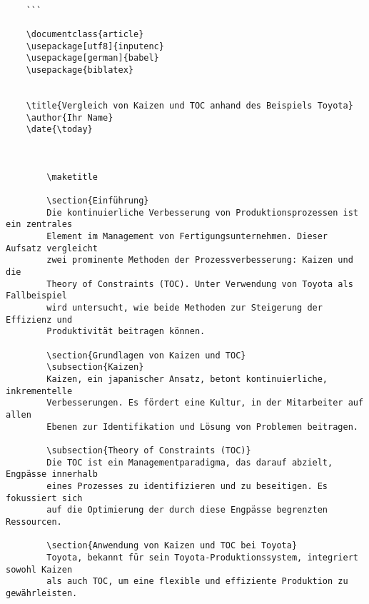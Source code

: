 \begin{verbatim}
	
	```
	
	\documentclass{article}
	\usepackage[utf8]{inputenc}
	\usepackage[german]{babel}
	\usepackage{biblatex}
	
	
	\title{Vergleich von Kaizen und TOC anhand des Beispiels Toyota}
	\author{Ihr Name}
	\date{\today}
	
	
		
		\maketitle
		
		\section{Einführung}
		Die kontinuierliche Verbesserung von Produktionsprozessen ist ein zentrales
		Element im Management von Fertigungsunternehmen. Dieser Aufsatz vergleicht
		zwei prominente Methoden der Prozessverbesserung: Kaizen und die
		Theory of Constraints (TOC). Unter Verwendung von Toyota als Fallbeispiel
		wird untersucht, wie beide Methoden zur Steigerung der Effizienz und
		Produktivität beitragen können.
		
		\section{Grundlagen von Kaizen und TOC}
		\subsection{Kaizen}
		Kaizen, ein japanischer Ansatz, betont kontinuierliche, inkrementelle
		Verbesserungen. Es fördert eine Kultur, in der Mitarbeiter auf allen 
		Ebenen zur Identifikation und Lösung von Problemen beitragen.
		
		\subsection{Theory of Constraints (TOC)}
		Die TOC ist ein Managementparadigma, das darauf abzielt, Engpässe innerhalb
		eines Prozesses zu identifizieren und zu beseitigen. Es fokussiert sich 
		auf die Optimierung der durch diese Engpässe begrenzten Ressourcen.
		
		\section{Anwendung von Kaizen und TOC bei Toyota}
		Toyota, bekannt für sein Toyota-Produktionssystem, integriert sowohl Kaizen 
		als auch TOC, um eine flexible und effiziente Produktion zu gewährleisten.
		

\end{verbatim}
